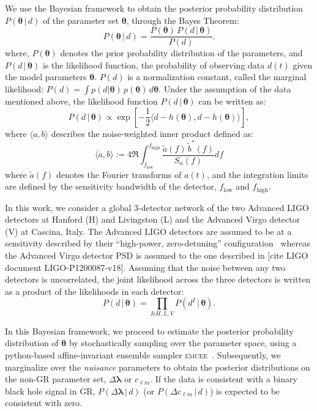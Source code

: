 \documentclass[prd,preprintnumbers,twocolumn,eqsecnum,floatfix,a4paper,nofootinbib,superscriptaddress]{revtex4}
\newcommand{\blambda}{\bm{\lambda}}
\newcommand{\btheta}{\bm{\theta}}
\begin{document}
We use the Bayesian framework to obtain the posterior probability distribution $P({\btheta} \, | \, d)$ of the parameter set $\btheta$, through the Bayes Theorem:
\begin{equation}
P({\btheta} \, | \, d) = \frac{P({\btheta}) \, P (d \, | \, {\btheta})}{P(d)}.
\label{eq:Bayes_theorem}
\end{equation} 
where, $P({\btheta})$ denotes the prior probability distribution of the parameters, and $P (d \, | \, {\btheta})$ is the likelihood function, the probability of observing data $d(t)$ given the model parameters $\btheta$. $P(d)$ is a normalization constant, called the marginal likelihood: $P(d) = \int p(d|\btheta) \, p(\btheta) \, d\btheta$. Under the assumption of the data mentioned above, the likelihood function $P(d \, | \, {\btheta})$ can be written as:
\begin{equation}
P (d \, | \, {\btheta}) \propto \exp \left[ -\frac{1}{2} \langle d - h({\btheta}), d - h({\btheta}) \rangle \right],
\end{equation}
where $\langle a, b \rangle$ describes the noise-weighted inner product defined as:
\begin{equation}
\langle a, b \rangle := 4 \Re \int_{f_\mathrm{low}}^{f_\mathrm{high}} \frac{\tilde{a}(f) \, \tilde{b}^*(f)}{S_n(f)}df
\end{equation}
where $\tilde{a}(f)$ denotes the Fourier transforms of $a(t)$, and the integration limits are defined by the sensitivity bandwidth of the detector, $f_\mathrm{low}$ and $f_\mathrm{high}$.

In this work, we consider a global 3-detector network of the two Advanced LIGO detectors at Hanford (H) and Livingston (L) and the Advanced Virgo detector (V) at Cascina, Italy. The Advanced LIGO detectors are assumed to be at a sensitivity described by their ``high-power, zero-detuning'' configuration~\cite{aLIGOZeroDetHighPower} whereas the Advanced Virgo detector PSD is assumed to the one described in [cite LIGO document LIGO-P1200087-v18]. Assuming that the noise between any two detectors is uncorrelated, the joint likelihood across the three detectors is written as a product of the likelihoods in each detector:
\begin{equation}
P (d \, | \, {\btheta}) = \prod_{I \epsilon {H,L,V}} P (d^{I} \, | \, {\btheta}).
\end{equation}

In this Bayesian framework, we proceed to estimate the posterior probability distribution of $\btheta$ by stochastically sampling over the parameter space, using a python-based affine-invariant ensemble sampler \textsc{emcee}~\cite{foreman2013emcee, goodman2010ensemble}. Subsequently, we marginalize over the \textit{nuisance} parameters to obtain the posterior distributions on the non-GR parameter set, ${\Delta \blambda}$ or $c_{\ell m}$. If the data is consistent with a binary black hole signal in GR, $P(\Delta \blambda \, | \, d)$ (or $P(\Delta c_{\ell m} \, | \, d)$) is expected to be consistent with zero. 
\end{document}

